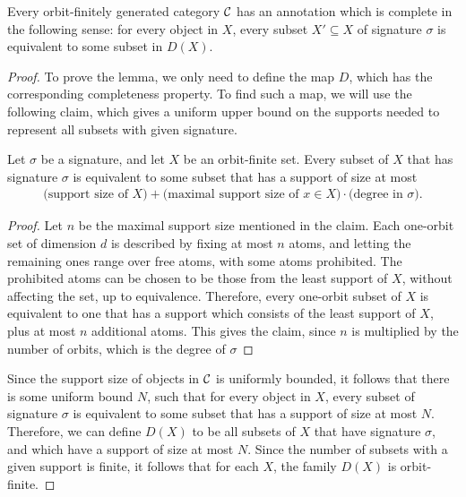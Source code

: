 \begin{lemma}\label{lem:complete-annotation-exists}
    Every orbit-finitely generated category ${\mathcal C}$ has  an  annotation which is complete in the following sense: for every object in $X$, every subset $X' \subseteq X$ of signature $\sigma$ is equivalent to some subset in $D(X)$.
\end{lemma}
\begin{proof}
    To prove the lemma, we only need to define the map $D$, which has the corresponding completeness property. To find such a map, we will use the following claim, which gives a uniform upper bound on the supports needed to represent all subsets with given signature.

    \begin{claim}\label{claim:bound-on-support-size-for-representatives}
        Let $\sigma$ be a signature, and let $X$ be an orbit-finite set. Every subset of $X$ that has signature $\sigma$ is equivalent to some subset that has a support of size at most
        \begin{align*}
        \text{(support size of $X$)} + \text{(maximal support size of $x \in X$)} \cdot \text{(degree in $\sigma$)}.
        \end{align*} 
    \end{claim}
\begin{proof}
    Let $n$ be the maximal support size mentioned in the claim.
    Each one-orbit set of dimension $d$ is described by fixing at most $n$ atoms, and letting the remaining ones range over free atoms, with some atoms prohibited. The  prohibited  atoms can be chosen to be those from the least support of $X$, without affecting the set, up to equivalence. Therefore, every one-orbit subset of $X$ is  equivalent to one that has a support which consists of the least support of $X$, plus at most $n$ additional atoms. This gives the claim, since $n$ is multiplied by the number of orbits, which is the degree of $\sigma$
\end{proof}
    Since the support size of objects in ${\mathcal C}$ is uniformly bounded, it follows that there is some uniform bound $N$, such that for every object in $X$, every subset of signature $\sigma$ is equivalent to some subset that has a support of size at most $N$. Therefore, we can define $D(X)$ to be all subsets of $X$ that have signature $\sigma$, and which have a support of size at most $N$. Since the number of subsets with a given support is finite, it follows that for each $X$, the family $D(X)$ is orbit-finite. 
\end{proof}

